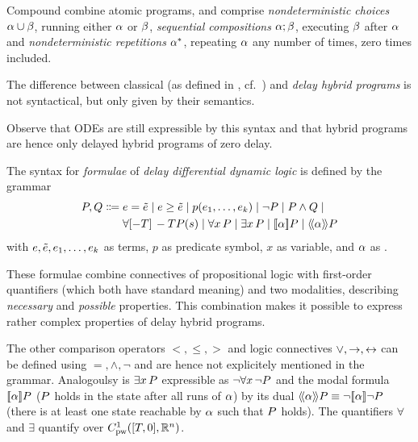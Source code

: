     Compound \dHPs combine atomic programs, and comprise \emph{nondeterministic choices} ${\alpha}\cup{\beta}$, running either $\alpha$ or $\beta$, \emph{sequential compositions} $\alpha;\beta$, executing $\beta$ after $\alpha$ and \emph{nondeterministic repetitions} ${\alpha}^{*}$, repeating $\alpha$ any number of times, zero times included.

    The difference between classical \HPs (as defined in \dL, cf.~\cite{Platzer10HybridSystems,Platzer12LogicsDynSys,Platzer15Uniform}) and \emph{delay hybrid programs} is not syntactical, but only given by their semantics.
    
    Observe that ODEs are still expressible by this syntax and that  hybrid programs are hence only delayed hybrid programs of zero delay.

    \begin{definition}\label{def:syntax-formula}
        The syntax for \emph{formulae} of \emph{delay differential dynamic logic} is defined by the grammar
        \begin{align*}
            \asfml,\bsfml \Coloneqq{}& %
                \astrm = \bstrm \mid
                \astrm\geq\bstrm \mid
                p(\range{\istrm{1}}{\istrm{k}}) \mid
                \lnot\asfml \mid
                \asfml\land\bsfml \mid\\
                &\hs{-T}{\asfml(s)} \mid
                \lforall{x}{\asfml} \mid
                \lexists{x}{\asfml} \mid
                \dbox{\asprg}{\asfml} \mid
                \ddiamond{\asprg}{\asfml}
        \end{align*}
        with $e,\tilde{e},e_{1},\ldots,e_{k}$ as \ddL terms, $p$ as predicate symbol, $x$ as variable, and $\alpha$ as \dHP.
    \end{definition}

    These formulae combine connectives of propositional logic with first-order quantifiers (which both have standard meaning) and two modalities, describing \emph{necessary} and \emph{possible} properties.
    This combination makes it possible to express rather complex properties of delay hybrid programs.

    The other comparison operators $<,\leq,>$ and logic connectives $\lor,\rightarrow,\leftrightarrow$ can be defined using $=,\land,\lnot$ and are hence not explicitely mentioned in the grammar.
    Analogoulsy is $\exists x{\,} P$ expressible as $\lnot\forall x{\,} \lnot P$ and the modal formula $\dbox{\asprg}{\asfml}$ ($P$ holds in the state after all runs of $\alpha$) by its dual $\ddiamond{\asprg}{\asfml}\equiv\lnot\dbox{\asprg}{\lnot\asfml}$ (there is at least one state reachable by $\alpha$ such that $P$ holds).
    The quantifiers $\forall$ and $\exists$ quantify over $\statespace$.

